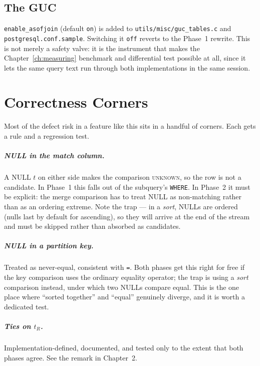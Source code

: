 \documentclass[11pt,a4paper]{report}
\theoremstyle{definition}
\theoremstyle{plain}
\newcommand{\code}[1]{\texttt{\small #1}}
\newcommand{\file}[1]{\texttt{\footnotesize #1}}
\begin{document}
\section{The GUC}

\code{enable\_asofjoin} (default \code{on}) is added to
\file{utils/misc/guc\_tables.c} and \file{postgresql.conf.sample}. Switching it
\code{off} reverts to the Phase~1 rewrite. This is not merely a safety valve: it is the
instrument that makes the Chapter~\ref{ch:measuring} benchmark and differential test
possible at all, since it lets the same query text run through both implementations in the
same session.


\chapter{Correctness Corners}

Most of the defect risk in a feature like this sits in a handful of corners. Each gets a
rule and a regression test.

\paragraph{NULL in the match column.} A NULL $t$ on either side makes the comparison
\textsc{unknown}, so the row is not a candidate. In Phase~1 this falls out of the subquery's
\code{WHERE}. In Phase~2 it must be explicit: the merge comparison has to treat NULL as
non-matching rather than as an ordering extreme. Note the trap --- in a \emph{sort}, NULLs
are ordered (nulls last by default for ascending), so they will arrive at the end of the
stream and must be skipped rather than absorbed as candidates.

\paragraph{NULL in a partition key.} Treated as never-equal, consistent with \code{=}. Both
phases get this right for free if the key comparison uses the ordinary equality operator;
the trap is using a \emph{sort} comparison instead, under which two NULLs compare equal.
This is the one place where ``sorted together'' and ``equal'' genuinely diverge, and it is
worth a dedicated test.

\paragraph{Ties on $t_R$.} Implementation-defined, documented, and tested only to the extent
that both phases agree. See the remark in Chapter~2.
\end{document}
